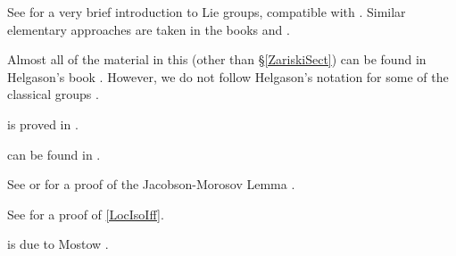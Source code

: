 \begin{notes}

See \cite{Howe-VeryBasic} for a very brief introduction to Lie groups, compatible with . Similar elementary approaches are taken in the books \cite{Baker-MatGrps} and \cite{Hall-LieGrps}.

Almost all of the material in this  (other than \S\ref{ZariskiSect}) %
 can be found in
Helgason's book \cite{HelgasonBook}. However, we do not
follow Helgason's notation for some of the classical groups
.

 is proved in \cite[Thm.~8.3.2, p.~112]{Hochschild-AlgicGrps}.



 can be found in
\cite[Lem.~IX.7.1, p.~430]{HelgasonBook}.

See \cite[Prop.~2 in \S11.2 of Chapter~8, p.~166]{BourbakiLie7-9} or \cite[Thm.~3.17, p.~100]{Jacobson-LieAlgs} for a proof of the Jacobson-Morosov Lemma .

See \cite[Thm.~2.7.5, p.~71]{VaradarajanBook} for a proof of \cref{LocIsoIff}.

 is due to Mostow
\cite{Mostow-SelfAdjoint}.





\end{notes}





